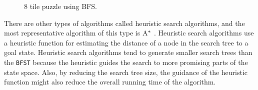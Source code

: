 \iftrue
\begin{landscape}
\begin{figure}[htb]

\resizebox{\dimexpr\linewidth-1cm}{!}{%
\begin{forest}
[\usebox\myboxbfsone
  [\usebox\myboxbfstwo
	[\usebox\myboxbfsfive
		[\usebox\myboxbfsten
			[\usebox\myboxbfstwenty
				[\usebox\myboxbfsthirtyfour]
				[\usebox\myboxbfsthirtyfive]			
			]		
		]
		[\usebox\myboxbfseleven
			[\usebox\myboxbfstwentyone
				[\usebox\myboxbfsthirtysix]
				[\usebox\myboxbfsthirtyseven]			
			]
			[\usebox\myboxbfstwentytwo
				[\usebox\myboxbfsthirtyeight]
				[\usebox\myboxbfsthirtynine]			
			]
			[\usebox\myboxbfstwentythree
				[\usebox\myboxbfsforty]
				[\usebox\myboxbfsfortyone]			
			]		
		]	
	]  
  ]
  [\usebox\myboxbfsthree
	[\usebox\myboxbfssix
		[\usebox\myboxbfstwelve
			[\usebox\myboxbfstwentyfour
				[\usebox\myboxbfsfortytwo]
				[\usebox\myboxbfsfortythree]			
			]		
		]
		[\usebox\myboxbfsthirteen
			[\usebox\myboxbfstwentyfive
				[\usebox\myboxbfsfortyfour]
				[\usebox\myboxbfsfortyfive]			
			]		
		]	
	]
	[\usebox\myboxbfsseven
		[\usebox\myboxbfsfourteen
			[\usebox\myboxbfstwentysix
				[\usebox\myboxbfsfortysix]			
			]		
		]
		[\usebox\myboxbfsfifteen
			[\usebox\myboxbfstwentyseven]		
		]	
	]
	[\usebox\myboxbfseight
		[\usebox\myboxbfssixteen
			[\usebox\myboxbfstwentyeight]		
		]
		[\usebox\myboxbfsseventeen
			[\usebox\myboxbfstwentynine]		
		]	
	]  
  ]
  [\usebox\myboxbfsfour
	[\usebox\myboxbfsnine
		[\usebox\myboxbfseighteen
			[\usebox\myboxbfsthirty]
			[\usebox\myboxbfsthirtyone]
			[\usebox\myboxbfsthirtytwo]
		]
		[\usebox\myboxbfsnineteen
			[\usebox\myboxbfsthirtythree]		
		]
	]  
  ]
]
\end{forest}
}
\caption{8 tile puzzle using BFS. \cite{bernard2011}} \label{fig:bfs_solution}
\end{figure}
\end{landscape}
\fi

There are other types of algorithms called heuristic search algorithms, and the most representative algorithm of this type is A$\sp{*}$ \cite{hart1968formal}. %
Heuristic search algorithms use a heuristic function for estimating the distance of a node in the search tree to a goal state. Heuristic search algorithms tend to generate smaller search trees than the \texttt{BFST} because the heuristic guides the search to more promising parts of the state space. Also, by reducing the search tree size, the guidance of the heuristic function might also reduce the overall running time of the algorithm.

